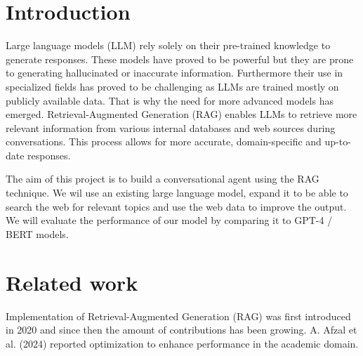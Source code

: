 \documentclass[fleqn,moreauthors,10pt]{ds_report}
\affiliation{\textit{Advisors: Aleš Žagar}}
\begin{document}
\flushbottom 

\maketitle 

\thispagestyle{empty} 


\section*{Introduction}
Large language models (LLM) rely solely on their pre-trained knowledge to generate responses. 
These models have proved to be powerful but they are prone to generating hallucinated or inaccurate information. 
Furthermore their use in specialized fields has proved to be challenging as LLMs are trained mostly on publicly available 
data. That is why the need for more advanced models has emerged. Retrieval-Augmented Generation (RAG) enables LLMs to 
retrieve more relevant information from various internal databases and web sources during conversations. 
This process allows for more accurate, domain-specific and up-to-date responses.

The aim of this project is to build a conversational agent using the RAG technique. We wil use an existing large language model, 
expand it to be able to search the web for relevant topics and use the web data to improve the output. We will evaluate 
the performance of our model by comparing it to GPT-4 / BERT models.



\section*{Related work}

Implementation of Retrieval-Augmented Generation (RAG) was first introduced in 2020 and since then the amount of contributions has been growing. A. Afzal et al. (2024) reported optimization to enhance performance in the academic domain.

\end{document}
